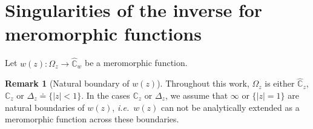 \documentclass[final,3p,times]{elsarticle}
\newcommand{\CC}{\ensuremath{{\mathbb C}}}
\newcommand{\CW}{\ensuremath{{\widehat{\mathbb C}}}}
\newcommand{\abs}[1]{\left\lvert#1\right\rvert}
\theoremstyle{definition}
\newtheorem{remark}[theorem]{Remark}
\begin{document}
\section{Singularities of the inverse for meromorphic functions}

Let $w(z): \Omega_z \longrightarrow \CW_w$ be a  
meromorphic function. 

\begin{remark}[Natural boundary of $w(z)$]
\label{rem:natural-boundaries}
Throughout this work,  
$\Omega_z$ is either $\CW_z$, $\CC_z$ or $\Delta_z\doteq \{\abs{z}<1\}$. 
In the cases  $\CC_z$ or $\Delta_z$, 
we assume that 
$\infty$ or $\{ \abs{z}=1 \}$ are natural boundaries of $w(z)$, 
\emph{i.e.}\ $w(z)$
can not be analytically extended as a meromorphic
function across these boundaries.
\end{remark} 
\end{document}
